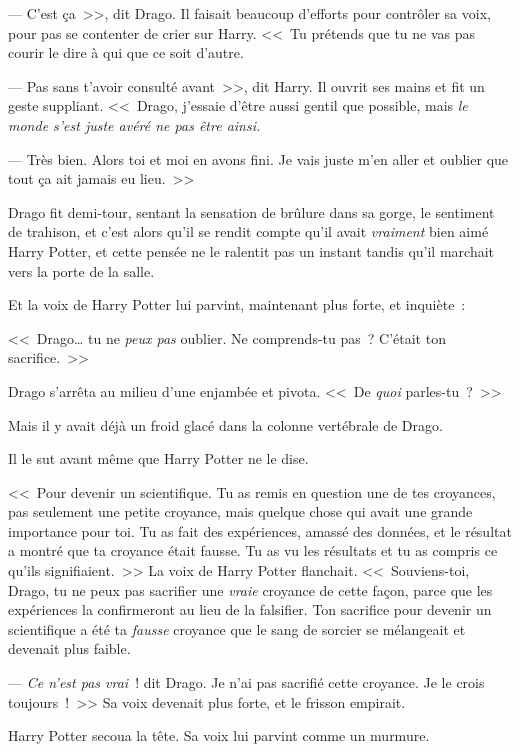 --- C'est ça~>>, dit Drago. Il faisait beaucoup d'efforts pour contrôler sa voix, pour pas se contenter de crier sur Harry. <<~Tu prétends que tu ne vas pas courir le dire à qui que ce soit d'autre.

--- Pas sans t'avoir consulté avant~>>, dit Harry. Il ouvrit ses mains et fit un geste suppliant. <<~Drago, j'essaie d'être aussi gentil que possible, mais \emph{le monde s'est juste avéré ne pas être ainsi.}

--- Très bien. Alors toi et moi en avons fini. Je vais juste m'en aller et oublier que tout ça ait jamais eu lieu.~>>

Drago fit demi-tour, sentant la sensation de brûlure dans sa gorge, le sentiment de trahison, et c'est alors qu'il se rendit compte qu'il avait \emph{vraiment} bien aimé Harry Potter, et cette pensée ne le ralentit pas un instant tandis qu'il marchait vers la porte de la salle.

Et la voix de Harry Potter lui parvint, maintenant plus forte, et inquiète~:

<<~Drago… tu ne \emph{peux pas} oublier. Ne comprends-tu pas~? C'était ton sacrifice.~>>

Drago s'arrêta au milieu d'une enjambée et pivota. <<~De \emph{quoi} parles-tu~?~>>

Mais il y avait déjà un froid glacé dans la colonne vertébrale de Drago.

Il le sut avant même que Harry Potter ne le dise.

<<~Pour devenir un scientifique. Tu as remis en question une de tes croyances, pas seulement une petite croyance, mais quelque chose qui avait une grande importance pour toi. Tu as fait des expériences, amassé des données, et le résultat a montré que ta croyance était fausse. Tu as vu les résultats et tu as compris ce qu'ils signifiaient.~>> La voix de Harry Potter flanchait. <<~Souviens-toi, Drago, tu ne peux pas sacrifier une \emph{vraie} croyance de cette façon, parce que les expériences la confirmeront au lieu de la falsifier. Ton sacrifice pour devenir un scientifique a été ta \emph{fausse} croyance que le sang de sorcier se mélangeait et devenait plus faible.

--- \emph{Ce n'est pas vrai}~! dit Drago. Je n'ai pas sacrifié cette croyance. Je le crois toujours~!~>> Sa voix devenait plus forte, et le frisson empirait.

Harry Potter secoua la tête. Sa voix lui parvint comme un murmure.

